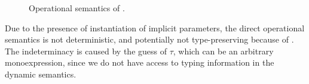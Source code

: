 \begin{figure}[t]
    \centering


    \caption{Operational semantics of \name.}
    \label{fig:semantics}
\end{figure}

Due to the presence of instantiation of implicit parameters, the direct operational
semantics is not deterministic, and potentially not type-preserving because of
. The indeterminacy is caused by the guess of $\tau$,
which can be an arbitrary monoexpression, since we do not have access to typing
information in the dynamic semantics.

